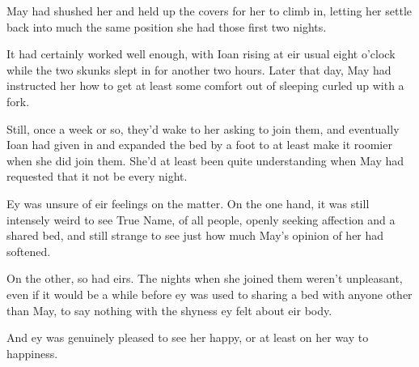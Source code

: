 May had shushed her and held up the covers for her to climb in, letting her settle back into much the same position she had those first two nights.

It had certainly worked well enough, with Ioan rising at eir usual eight o'clock while the two skunks slept in for another two hours. Later that day, May had instructed her how to get at least some comfort out of sleeping curled up with a fork.

Still, once a week or so, they'd wake to her asking to join them, and eventually Ioan had given in and expanded the bed by a foot to at least make it roomier when she did join them. She'd at least been quite understanding when May had requested that it not be every night.

Ey was unsure of eir feelings on the matter. On the one hand, it was still intensely weird to see True Name, of all people, openly seeking affection and a shared bed, and still strange to see just how much May's opinion of her had softened.

On the other, so had eirs. The nights when she joined them weren't unpleasant, even if it would be a while before ey was used to sharing a bed with anyone other than May, to say nothing with the shyness ey felt about eir body.

And ey was genuinely pleased to see her happy, or at least on her way to happiness.
